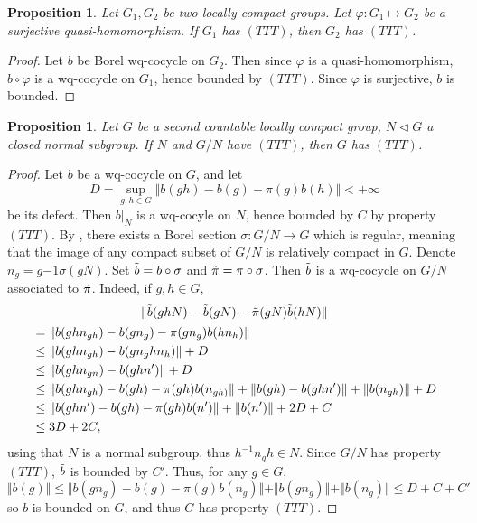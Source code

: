 \documentclass{article}
\newtheorem{prop}[theorem]{Proposition}
\theoremstyle{definition}
\theoremstyle{remark}
\numberwithin{equation}{section}
\begin{document}
\begin{prop}
    \label{prop:stab_image}Let $G_1,G_2$ be two locally compact groups.
    Let $\varphi:G_1\mapsto G_2$ be a surjective quasi-homomorphism. If $G_1$ has $(TTT)$, then $G_2$ has $(TTT)$.
\end{prop}

\begin{proof}
Let $b$ be Borel wq-cocycle on $G_2$. Then since $\varphi$ is a quasi-homomorphism, $b\circ \varphi$ is a wq-cocycle on $G_1$, hence bounded by $(TTT)$. Since $\varphi$ is surjective, $b$ is bounded.
\end{proof}


\begin{prop}\label{prop:ext}
Let $G$ be a second countable locally compact group, $N\triangleleft G$ a closed normal subgroup. If $N$ and $G/N$ have $(TTT)$, then $G$ has $(TTT)$.    
\end{prop}

\begin{proof}Let $b$ be a wq-cocycle on $G$, and let $$D=\underset{g,h\in G}{\sup} \Vert b(gh)-b(g)-\pi(g)b(h)\Vert<+\infty$$ be its defect. Then $b\vert_N$ is a wq-cocyle on $N$, hence bounded by $C$ by property $(TTT)$. By \cite[Lemma 1.1]{mackey}, there exists a Borel section $\sigma:G/N\to G$ which is regular, meaning that the image of any compact subset of $G/N$ is relatively compact in $G$. Denote $n_g=g {-1}\sigma(gN)$. Set $\Tilde{b}=b\circ\sigma$ and $\Tilde{\pi}=\pi\circ \sigma$. Then $\Tilde{b}$ is a wq-cocycle on $G/N$ associated to $\Tilde{\pi}$. Indeed, if $g,h\in G$, 
\begin{multline*}
\Vert \Tilde{b}(ghN)-\Tilde{b}(gN)-\Tilde{\pi}(gN)\Tilde{b}(hN)\Vert\\
\begin{aligned}
     & = \Vert b(ghn_{gh})-b(gn_g)-\pi(gn_g)b(hn_h)\Vert\\
     &\leq \Vert b(ghn_{gh})-b(gn_ghn_h)\Vert+D\\
     &\leq \Vert b(ghn_{gn})-b(ghn')\Vert+D\\
    & \leq \Vert b(ghn_{gh})-b(gh)-\pi(gh)b(n_{gh)}\Vert+\Vert b(gh)-b(ghn')\Vert+\Vert b(n_{gh})\Vert+D\\
    & \leq \Vert b(ghn')-b(gh)-\pi(gh)b(n')\Vert+\Vert b(n')\Vert + 2D+C\\
    & \leq 3D+2C,
\end{aligned}
\end{multline*}
using that $N$ is a normal subgroup, thus $h^{-1}n_gh\in N$. Since $G/N$ has property $(TTT)$, $\Tilde{b}$ is bounded by $C'$. Thus, for any $g\in G$, $$\Vert b(g)\Vert \leq \Vert b(gn_g)-b(g)-\pi(g)b(n_g)\Vert+ \Vert b(gn_g)\Vert+\Vert b(n_g)\Vert \leq D+C+C'$$so $b$ is bounded on $G$, and thus $G$ has property $(TTT)$.
\end{proof}
\end{document}
